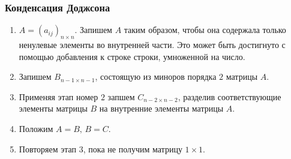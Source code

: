 \documentclass[12pt, a4paper]{article}
\begin{document}
    \subsubsection{Конденсация Доджсона}
    \begin{enumerate}
        \item \( A = (a_{ij})_{n\times n} \). Запишем \( A \) таким образом, чтобы она содержала только ненулевые элементы во внутренней части. Это может быть достигнуто с помощью добавления к строке строки, умноженной на число.
        \item Запишем \( B _{n-1 \times n-1} \), состоящую из миноров порядка \( 2 \) матрицы \( A \).
        \item Применяя этап номер \( 2 \) запшем \( C_{n-2 \times n-2} \), разделив соответствующие элементы матрицы \( B \) на внутренние элементы матрицы \( A \).
        \item Положим \( A = B, \, B = C \).
        \item Повторяем этап \( 3 \), пока не получим матрицу \( 1 \times 1 \).
    \end{enumerate}
\end{document}
